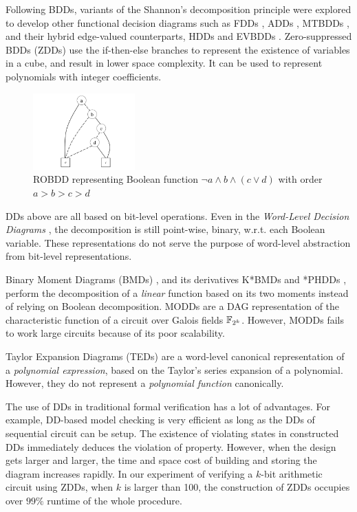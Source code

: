 Following BDDs,  variants of the Shannon's decomposition principle
were explored to develop other functional decision diagrams such as
 FDDs \cite{okfdd}, ADDs \cite{add}, MTBDDs \cite{mtbdd}, and their hybrid 
edge-valued counterparts, HDDs \cite{hdd} and EVBDDs \cite{evbdd}. 
Zero-suppressed BDDs (ZDDs) \cite{minato1993zero,minato1994calculation} use the if-then-else branches
to represent the existence of variables in a cube, and result in lower 
space complexity. It can be used to represent polynomials with integer coefficients.

\begin{figure}[h]
\centerline{
\includegraphics[width=0.35\textwidth]{newfig/BDD.pdf}
}
\caption{ROBDD representing Boolean function $\neg a \land b \land (c\lor d)$ with order $a>b>c>d$}
\label{fig:BDD}
\end{figure}

DDs above are all based on bit-level operations. Even in the {\it Word-Level Decision Diagrams}
\cite{WLS}, the decomposition is still point-wise, binary, 
w.r.t. each Boolean variable. These representations do not
serve the purpose of word-level abstraction from bit-level
representations. 

Binary Moment Diagrams (BMDs) \cite{bmd}, and its derivatives K*BMDs
\cite{kbmd} and *PHDDs \cite{phdd}, perform the decomposition of a {\it linear} function
based on its two moments instead of relying on Boolean decomposition. 
MODDs \cite{modd} \cite{modd_tcomp} are a DAG representation of the
characteristic function of a circuit over Galois fields ${\mathbb{F}}_{2^k}$. 
However, MODDs fails to work large circuits because of its poor scalability.


Taylor Expansion Diagrams (TEDs) \cite{ted_tcomp} are a
word-level canonical representation of a {\it polynomial expression},
based on the Taylor's series expansion of a polynomial. However, they do
not represent a {\it polynomial function} canonically. 

The use of DDs in traditional formal verification has a lot of advantages. 
For example, DD-based model checking is very efficient as long as the DDs of sequential 
circuit can be setup. The existence of violating states in constructed DDs 
immediately deduces the violation of property. However, when the design gets
larger and larger, the time and space cost of building and storing the diagram 
increases rapidly. In our experiment of verifying a $k$-bit arithmetic circuit 
using ZDDs, when $k$ is larger than 100, the construction of ZDDs occupies 
over $99\%$ runtime of the whole procedure.
